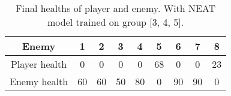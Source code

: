 \begin{table}[ht]\centering
\begin{tabular}{|c|c|c|c|c|c|c|c|c|}
\hline
Enemy & 1 & 2 & 3 & 4 & 5 & 6 & 7 & 8\\
\hline
Player health & 0 & 0 & 0 & 0 & 68 & 0 & 0 & 23\\
\hline
Enemy health & 60 & 60 & 50 & 80 & 0 & 90 & 90 & 0\\
\hline
\end{tabular}
\caption{Final healths of player and enemy. With NEAT model trained on group [3, 4, 5].}
\label{tab:test_NEAT_3_4_5}
\end{table}